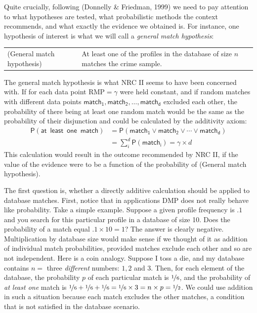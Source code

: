 \documentclass[10pt,dvipsnames,enabledeprecatedfontcommands]{scrartcl}
\newcommand{\pr}[1]{\mathsf{P}(#1)}
\begin{document}
Quite crucially, following (Donnelly \& Friedman, 1999) we need to pay
attention to what hypotheses are tested, what probabilistic methods the
context recommends, and what exactly the evidence we obtained is. For
instance, one hypothesis of interest is what we will call a
\emph{general match hypothesis}: \vspace{1mm}

\begin{tabular}{lp{8cm}}
(General match hypothesis) &
At least one of the profiles in the database of size $n$ 
matches the crime sample.
\end{tabular}
\vspace{1mm}

\noindent The general match hypothesis is what NRC II seems to have been
concerned with. If for each data point RMP\(=\gamma\) were held
constant, and if random matches with different data points
\(\mathsf{match_1, match_2, \dots, match_d}\) excluded each other, the
probability of there being at least one random match would be the same
as the probability of their disjunction and could be calculated by the
additivity axiom: \begin{align*}
\pr{\mathsf{at\,\,\, least\,\,\, one\,\,\, match}} & = \pr{\mathsf{match_1} \vee \mathsf{match_2} \vee \cdots \vee \mathsf{match_d}} \\
& = \sum_{i}^d \pr{\mathsf{match_i}} = \gamma \times d
\end{align*} This calculation would result in the outcome recommended by
NRC II, if the value of the evidence were to be a function of the
probability of (General match hypothesis).

The first question is, whether a directly additive calculation should be
applied to database matches. First, notice that in applications DMP does
not really behave like probability. Take a simple example. Suppose a
given profile frequency is \(.1\) and you search for this particular
profile in a database of size 10. Does the probability of a match equal
\(.1 \times 10=1\)? The answer is clearly negative. Multiplication by
database size would make sense if we thought of it as addition of
individual match probabilities, provided matches exclude each other and
so are not independent. Here is a coin analogy. Suppose I toss a die,
and my database contains \(n=\) three \emph{different} numbers: \(1, 2\)
and \(3\). Then, for each element of the database, the probability \(p\)
of each particular match is \(\nicefrac{1}{6}\), and the probability of
\emph{at least one} match is
\(\nicefrac{1}{6}+\nicefrac{1}{6}+\nicefrac{1}{6}=\nicefrac{1}{6}\times 3 = n\times p =\nicefrac{1}{2}\).
We could use addition in such a situation because each match excludes
the other matches, a condition that is not satisfied in the database
scenario.
\end{document}
